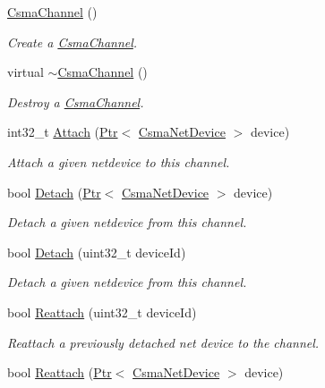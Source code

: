 \begin{DoxyCompactItemize}
\item 
\hyperlink{classns3_1_1CsmaChannel_aa9cf8af00b00403b00c004c6d8ea468c}{Csma\+Channel} ()
\begin{DoxyCompactList}\small\item\em Create a \hyperlink{classns3_1_1CsmaChannel}{Csma\+Channel}. \end{DoxyCompactList}\item 
virtual \hyperlink{classns3_1_1CsmaChannel_a7c8d5066253229d9e3cd51db0ca7cff1}{$\sim$\+Csma\+Channel} ()
\begin{DoxyCompactList}\small\item\em Destroy a \hyperlink{classns3_1_1CsmaChannel}{Csma\+Channel}. \end{DoxyCompactList}\item 
int32\+\_\+t \hyperlink{classns3_1_1CsmaChannel_ad06859a90c5183e5b085d4ecee4a7e31}{Attach} (\hyperlink{classns3_1_1Ptr}{Ptr}$<$ \hyperlink{classns3_1_1CsmaNetDevice}{Csma\+Net\+Device} $>$ device)
\begin{DoxyCompactList}\small\item\em Attach a given netdevice to this channel. \end{DoxyCompactList}\item 
bool \hyperlink{classns3_1_1CsmaChannel_aab7a637075c9f726d35c6ce4b0b340a1}{Detach} (\hyperlink{classns3_1_1Ptr}{Ptr}$<$ \hyperlink{classns3_1_1CsmaNetDevice}{Csma\+Net\+Device} $>$ device)
\begin{DoxyCompactList}\small\item\em Detach a given netdevice from this channel. \end{DoxyCompactList}\item 
bool \hyperlink{classns3_1_1CsmaChannel_a8c59fcebb119246c6ce9bba20960e1a3}{Detach} (uint32\+\_\+t device\+Id)
\begin{DoxyCompactList}\small\item\em Detach a given netdevice from this channel. \end{DoxyCompactList}\item 
bool \hyperlink{classns3_1_1CsmaChannel_a52339f677480bcca7068c27cc700b6d5}{Reattach} (uint32\+\_\+t device\+Id)
\begin{DoxyCompactList}\small\item\em Reattach a previously detached net device to the channel. \end{DoxyCompactList}\item 
bool \hyperlink{classns3_1_1CsmaChannel_a8f054303846e4152ebcfdfc56557ee26}{Reattach} (\hyperlink{classns3_1_1Ptr}{Ptr}$<$ \hyperlink{classns3_1_1CsmaNetDevice}{Csma\+Net\+Device} $>$ device)

\end{DoxyCompactItemize}
